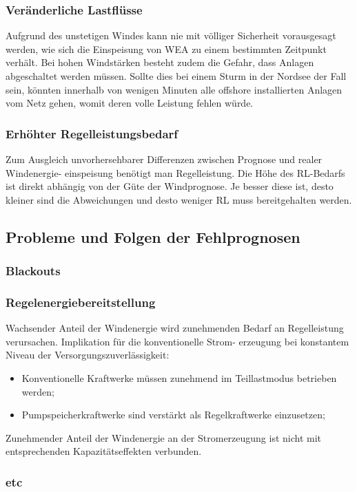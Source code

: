 \subsubsection*{Veränderliche Lastflüsse}
Aufgrund des unstetigen Windes kann nie mit völliger Sicherheit
vorausgesagt werden, wie sich die Einspeisung von WEA zu einem bestimmten
Zeitpunkt verhält. Bei hohen Windstärken besteht zudem die Gefahr, dass Anlagen
abgeschaltet werden müssen. Sollte dies bei einem Sturm in der Nordsee der Fall
sein, könnten innerhalb von wenigen Minuten alle offshore installierten Anlagen
vom Netz gehen, womit deren volle Leistung fehlen würde.
\subsubsection*{Erhöhter Regelleistungsbedarf}
Zum Ausgleich unvorhersehbarer Differenzen zwischen Prognose und realer
Windenergie- einspeisung benötigt man Regelleistung. Die Höhe des RL-Bedarfs ist
direkt abhängig von der Güte der Windprognose. Je besser diese ist, desto
kleiner sind die Abweichungen und desto weniger RL muss bereitgehalten
werden.\cite{prognose_doctor}

\subsection{Probleme und Folgen der Fehlprognosen}
\subsubsection*{Blackouts}
\subsubsection*{Regelenergiebereitstellung}
Wachsender Anteil der Windenergie wird zunehmenden Bedarf an Regelleistung
verursachen.
Implikation für die konventionelle Strom- erzeugung bei konstantem Niveau der
Versorgungszuverlässigkeit:
\begin{itemize}
	\item Konventionelle Kraftwerke müssen zunehmend im Teillastmodus
	betrieben werden;
	\item Pumpspeicherkraftwerke sind verstärkt als Regelkraftwerke
	einzusetzen;
\end{itemize}
Zunehmender Anteil der Windenergie an der Stromerzeugung ist nicht mit
entsprechenden Kapazitätseffekten verbunden.

\subsubsection*{etc}

